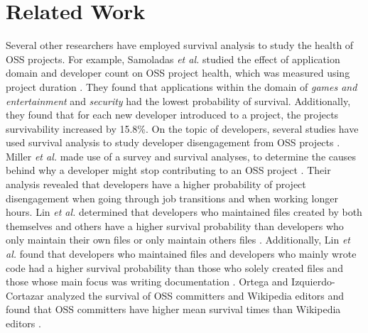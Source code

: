 \documentclass[sigconf,review]{acmart}
\begin{document}
\section{Related Work} \label{related}
Several other researchers have employed survival analysis to study the health of OSS projects. 
For example, Samoladas \emph{et al.} studied the effect of application domain and developer count on OSS project health, which was measured using project duration \cite{samoladas2010survival}. 
They found that applications within the domain of \emph{games and entertainment} and \emph{security} had the lowest probability of survival. 
Additionally, they found that for each new developer introduced to a project, the projects survivability increased by 15.8\%.
On the topic of developers, several studies have used survival analysis to study developer disengagement from OSS projects \cite{miller2019people,lin2017developer,ortega2009survival}. 
Miller \emph{et al.} made use of a survey and survival analyses, to determine the causes behind why a developer might stop contributing to an OSS project \cite{miller2019people}. 
Their analysis revealed that developers have a higher probability of project disengagement when going through job transitions and when working longer hours. 
Lin \emph{et al.} determined that developers who maintained files created by both themselves and others have a higher survival probability than developers who only maintain their own files or only maintain others files \cite{lin2017developer}. 
Additionally, Lin \emph{et al.} found that developers who maintained files and developers who mainly wrote code had a higher survival probability than those who solely created files and those whose main focus was writing documentation \cite{lin2017developer}. 
Ortega and Izquierdo-Cortazar analyzed the survival of OSS committers and Wikipedia editors and found that OSS committers have higher mean survival times than Wikipedia editors \cite{ortega2009survival}. 
\end{document}
